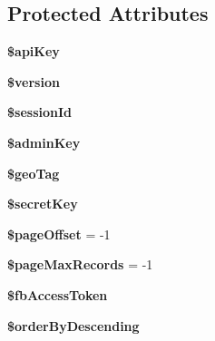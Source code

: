 \subsection*{Protected Attributes}
\begin{DoxyCompactItemize}
\item 
\hypertarget{class_app42_service_a084e3db37d1b117a3cc7212cf2eed533}{{\bfseries \$api\+Key}}\label{class_app42_service_a084e3db37d1b117a3cc7212cf2eed533}

\item 
\hypertarget{class_app42_service_a17c8948c68aa44fa9961ae169b6a8961}{{\bfseries \$version}}\label{class_app42_service_a17c8948c68aa44fa9961ae169b6a8961}

\item 
\hypertarget{class_app42_service_a6bb2ea848560b3d375a0a55bdd13ffa1}{{\bfseries \$session\+Id}}\label{class_app42_service_a6bb2ea848560b3d375a0a55bdd13ffa1}

\item 
\hypertarget{class_app42_service_acfbac27769056acea55463dcc851093a}{{\bfseries \$admin\+Key}}\label{class_app42_service_acfbac27769056acea55463dcc851093a}

\item 
\hypertarget{class_app42_service_ac056d1399ef4e63e1157dd832fa84dca}{{\bfseries \$geo\+Tag}}\label{class_app42_service_ac056d1399ef4e63e1157dd832fa84dca}

\item 
\hypertarget{class_app42_service_a766bfb236de2f29a3680976ca22790d4}{{\bfseries \$secret\+Key}}\label{class_app42_service_a766bfb236de2f29a3680976ca22790d4}

\item 
\hypertarget{class_app42_service_a53526464fc6c5edfdb64db50433e94ff}{{\bfseries \$page\+Offset} = -\/1}\label{class_app42_service_a53526464fc6c5edfdb64db50433e94ff}

\item 
\hypertarget{class_app42_service_a9ca9c827b0df635ea612e8cc0733f422}{{\bfseries \$page\+Max\+Records} = -\/1}\label{class_app42_service_a9ca9c827b0df635ea612e8cc0733f422}

\item 
\hypertarget{class_app42_service_a99974c69bbbb7d6aff2e481dce783c4d}{{\bfseries \$fb\+Access\+Token}}\label{class_app42_service_a99974c69bbbb7d6aff2e481dce783c4d}

\item 
\hypertarget{class_app42_service_ac20780798e1f20ce29b0bd9f2efe9e31}{{\bfseries \$order\+By\+Descending}}\label{class_app42_service_ac20780798e1f20ce29b0bd9f2efe9e31}


\end{DoxyCompactItemize}
